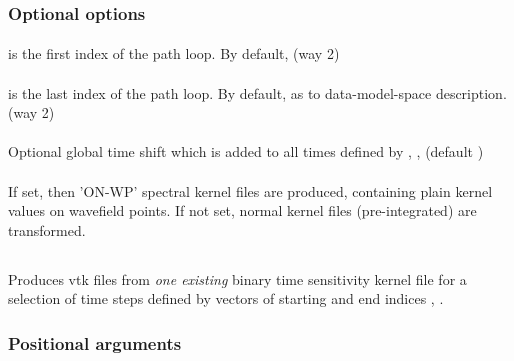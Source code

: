 \subsubsection{Optional options}
\paragraph{ }
 is the first index of the path loop. By default,  (way 2)
\paragraph{ }
 is the last index of the path loop. By default, 
 as to data-model-space description. (way 2)
\paragraph{}
Optional global time shift which is added to all times defined by , ,  (default )
\paragraph{}
If set, then 'ON-WP' spectral kernel files are produced, containing plain kernel values on wavefield 
points. If not set, normal kernel files (pre-integrated) are transformed.
%
%
\subsection{} \label{programs_scripts,sec:bin_prog,sec:timeKernel_2_vtk}
Produces vtk files from \emph{one existing} binary time sensitivity kernel file for a selection of time steps defined by vectors of starting and end indices  , .

\subsubsection{Positional arguments}
